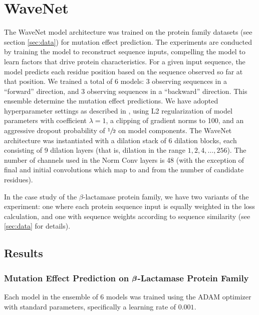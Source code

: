 \section{WaveNet}
\label{sec:wavenet_experiment}
The WaveNet model architecture was trained on the protein family datasets (see section \ref{sec:data}) for mutation effect prediction. The experiments are conducted by training the model to reconstruct sequence inputs, compelling the model to learn factors that drive protein characteristics. For a given input sequence, the model predicts each residue position based on the sequence observed so far at that position. We trained a total of 6 models: 3 observing sequences in a ``forward'' direction, and 3 observing sequences in a ``backward'' direction. This ensemble determine the mutation effect predictions. We have adopted hyperparameter settings as described in \cite{riesselman2019accelerating}, using L2 regularization of model parameters with coefficient $\lambda = 1$, a clipping of gradient norms to 100, and an aggressive dropout probability of $\sfrac{1}{2}$ on model components. The WaveNet architecture was instantiated with a dilation stack of 6 dilation blocks, each consisting of 9 dilation layers (that is, dilation in the range $1, 2, 4, \ldots, 256$).  The number of channels used in the Norm Conv layers is 48 (with the exception of final and initial convolutions which map to and from the number of candidate residues).

In the case study of the $\beta$-lactamase protein family, we have two variants of the experiment: one where each protein sequence input is equally weighted in the loss calculation, and one with sequence weights according to sequence similarity (see \ref{sec:data} for details).

\subsection{Results}

\subsubsection{Mutation Effect Prediction on $\bm{ \beta }$-Lactamase Protein Family}
Each model in the ensemble of 6 models was trained using the ADAM optimizer \cite{kingma2014adam} with standard parameters, specifically a learning rate of $0.001$.  

